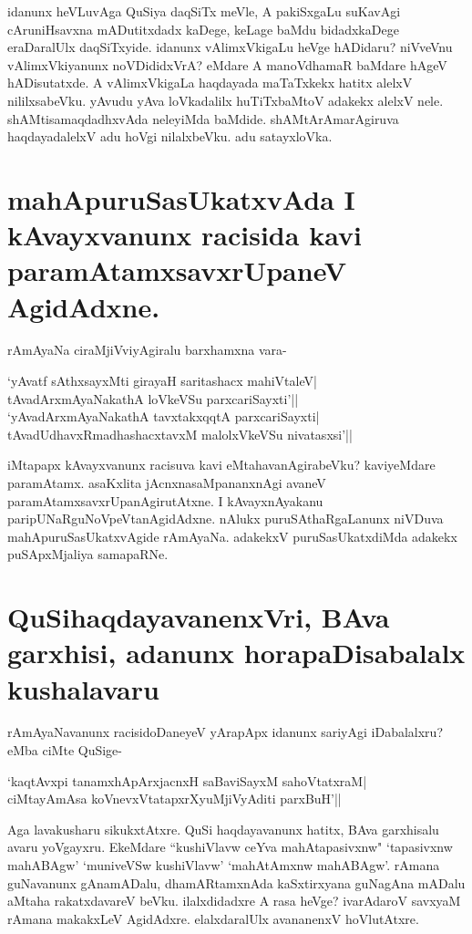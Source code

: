 idanunx heVLuvAga QuSiya daqSiTx meVle, A pakiSxgaLu suKavAgi cAruniHsavxna mADutitxdadx kaDege, keLage baMdu bidadxkaDege eraDaralUlx daqSiTxyide. idanunx vAlimxVkigaLu heVge hADidaru? niVveVnu vAlimxVkiyanunx noVDididxVrA? eMdare A manoVdhamaR baMdare hAgeV hADisutatxde. A vAlimxVkigaLa haqdayada maTaTxkekx hatitx alelxV nililxsabeVku. yAvudu yAva loVkadalilx huTiTxbaMtoV adakekx alelxV nele. shAMtisamaqdadhxvAda neleyiMda baMdide. shAMtArAmarAgiruva haqdayadalelxV adu hoVgi nilalxbeVku. adu satayxloVka. 

\section*{mahApuruSasUkatxvAda I kAvayxvanunx racisida kavi paramAtamxsavxrUpaneV AgidAdxne.} 

rAmAyaNa ciraMjiVviyAgiralu barxhamxna vara- 

\begin{shloka} 
`yAvatf sAthxsayxMti girayaH saritashacx mahiVtaleV|\label{166a}\\ 
tAvadArxmAyaNakathA loVkeVSu parxcariSayxti'||\\ 
`yAvadArxmAyaNakathA tavxtakxqqtA parxcariSayxti|\\ 
tAvadUdhavxRmadhashacxtavxM malolxVkeVSu nivatasxsi'||
\end{shloka} 

iMtapapx kAvayxvanunx racisuva kavi eMtahavanAgirabeVku? kaviyeMdare paramAtamx. asaKxlita jAcnxnasaMpananxnAgi avaneV paramAtamxsavxrUpanAgirutAtxne. I kAvayxnAyakanu paripUNaRguNoVpeVtanAgidAdxne. nAlukx puruSAthaRgaLanunx niVDuva mahApuruSasUkatxvAgide rAmAyaNa. adakekxV puruSasUkatxdiMda adakekx puSApxMjaliya samapaRNe. 

\section*{QuSihaqdayavanenxVri, BAva garxhisi, adanunx horapaDisabalalx kushalavaru} 

rAmAyaNavanunx racisidoDaneyeV yArapApx idanunx sariyAgi iDabalalxru? eMba ciMte QuSige- 

\begin{shloka} 
`kaqtAvxpi tanamxhApArxjacnxH saBaviSayxM sahoVtatxraM|\label{167}\\ 
ciMtayAmAsa koVnevxVtatapxrXyuMjiVyAditi parxBuH'||
\end{shloka} 

Aga lavakusharu sikukxtAtxre. QuSi haqdayavanunx hatitx, BAva garxhisalu avaru yoVgayxru. EkeMdare ``kushiVlavw ceYva mahAtapasivxnw"\label{167a} `tapasivxnw mahABAgw' `muniveVSw kushiVlavw' `mahAtAmxnw mahABAgw'. rAmana guNavanunx gAnamADalu, dhamARtamxnAda kaSxtirxyana guNagAna mADalu aMtaha rakatxdavareV beVku. ilalxdidadxre A rasa heVge? ivarAdaroV savxyaM rAmana makakxLeV AgidAdxre. elalxdaralUlx avananenxV hoVlutAtxre. 

